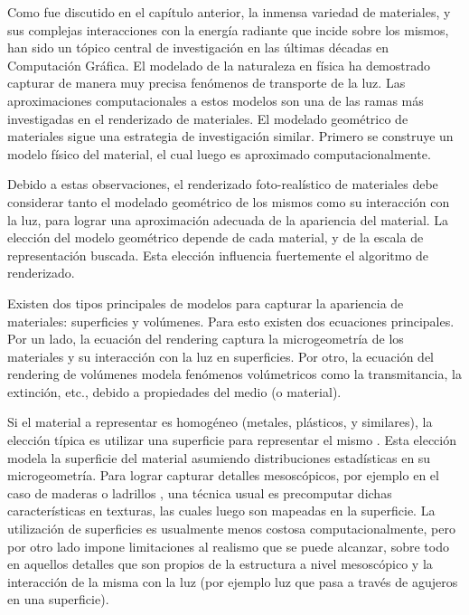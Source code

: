 Como fue discutido en el capítulo anterior, la inmensa variedad de materiales, y sus complejas interacciones con la energía radiante que incide sobre los mismos, han sido un tópico central de investigación en las últimas décadas en Computación Gráfica.
El modelado de la naturaleza en física ha demostrado capturar de manera muy precisa fenómenos de transporte de la luz.
Las aproximaciones computacionales a estos modelos son una de las ramas más investigadas en el renderizado de materiales.
El modelado geométrico de materiales sigue una estrategia de investigación similar. Primero se construye un modelo físico del material, el cual luego es aproximado computacionalmente.

Debido a estas observaciones, el renderizado foto-realístico de materiales debe considerar tanto el modelado geométrico de los mismos como su interacción con la luz, para lograr una aproximación adecuada de la apariencia del material.
La elección del modelo geométrico depende de cada material, y de la escala de representación buscada.
Esta elección influencia fuertemente el algoritmo de renderizado. 

Existen dos tipos principales de modelos para capturar la apariencia de materiales: superficies y volúmenes.
Para esto existen dos ecuaciones principales.
Por un lado, la ecuación del rendering \cite{Kajiya1986} captura la microgeometría de los materiales y su interacción con la luz en superficies.
Por otro, la ecuación del rendering de volúmenes \cite{Kajiya1984} modela fenómenos volúmetricos como la transmitancia, la extinción, etc., debido a propiedades del medio (o material).

Si el material a representar es homogéneo (metales, plásticos, y similares), la elección típica es utilizar una superficie para representar el mismo \cite{Neumann1999}.
Esta elección modela la superficie del material asumiendo distribuciones estadísticas en su microgeometría.
Para lograr capturar detalles mesoscópicos, por ejemplo en el caso de maderas o ladrillos \cite{Lefebvre2000}, una técnica usual es precomputar dichas características en texturas, las cuales luego son mapeadas en la superficie.
La utilización de superficies es usualmente menos costosa computacionalmente, pero por otro lado impone limitaciones al realismo que se puede alcanzar, sobre todo en aquellos detalles que son propios de la estructura a nivel mesoscópico y la interacción de la misma con la luz (por ejemplo luz que pasa a través de agujeros en una superficie).

